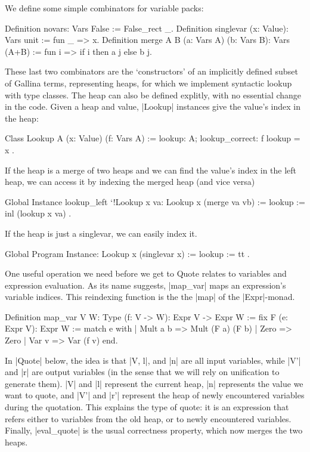 \documentclass[a4paper,10pt, runningheads]{llncs}
\begin{document}

\noindent We define some simple combinators for variable packs:
%
\begin{code}
Definition novars: Vars False := False_rect _.
Definition singlevar (x: Value): Vars unit := fun _ => x.
Definition merge {A B} (a: Vars A) (b: Vars B): Vars (A+B) :=
  fun i => if i then a j else b j.
\end{code}

\noindent These last two combinators are the `constructors' of an implicitly defined subset of
 Gallina terms, representing heaps, for which we implement syntactic lookup with type classes.
The heap can also be defined explitly, with no essential change in the code.
Given a heap and value, |Lookup| instances give the value's index in the heap:
\begin{code}
  Class Lookup {A} (x: Value) (f: Vars A) :=
    { lookup: A; lookup_correct: f lookup = x }.
\end{code}

If the heap is a merge of two heaps and we can find the value's index in the left heap, we can
access it by indexing the merged heap (and vice versa)
\begin{code}
  Global Instance lookup_left `{!Lookup x va}: Lookup x (merge va vb)
    := { lookup := inl (lookup x va) }.
\end{code}
If the heap is just a singlevar, we can easily index it.
\begin{code}
  Global Program Instance: Lookup x (singlevar x) := { lookup := tt }.
\end{code}

One useful operation we need before we get to Quote relates to variables and expression
 evaluation. As its name suggests, |map_var| maps an expression's variable indices.
This reindexing function is the the |map| of the |Expr|-monad.

\begin{code}
Definition map_var {V W: Type} (f: V -> W):
    Expr V -> Expr W :=
  fix F (e: Expr V): Expr W :=
    match e with
    | Mult a b => Mult (F a) (F b)
    | Zero => Zero
    | Var v => Var (f v)
    end.
\end{code}
In |Quote| below, the idea is that |V, l|, and |n| are all input variables, while |V'| and |r| are
output variables (in the sense that we will rely on unification to generate them). |V| and |l|
represent the current heap, |n| represents the value we want to quote, and |V'| and |r'| represent
the heap of newly encountered variables during the quotation.
  This explains the type of quote: it is an expression that refers either to variables from
the old heap, or to newly encountered variables. Finally, |eval_quote| is the usual correctness
property, which now merges the two heaps.
\end{document}
